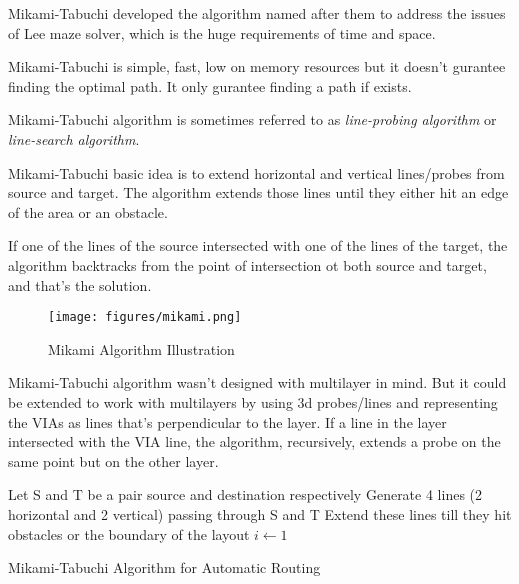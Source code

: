 Mikami-Tabuchi developed the algorithm named after them \cite{mikami1968computer} to address the issues of Lee maze solver, which is the huge requirements of time and space.

Mikami-Tabuchi is simple, fast, low on memory resources but it doesn't gurantee finding the optimal path. It only gurantee finding a path if exists.

Mikami-Tabuchi algorithm is sometimes referred to as \textit{line-probing algorithm} or \textit{line-search algorithm}.

Mikami-Tabuchi basic idea is to extend horizontal and vertical lines/probes from source and target. The algorithm extends those lines until they either hit an edge of the area or an obstacle.

If one of the lines of the source intersected with one of the lines of the target, the algorithm backtracks from the point of intersection ot both source and target, and that's the solution.

\begin{figure}
    \centering
    \texttt{[image: figures/mikami.png]}
    \caption{Mikami Algorithm Illustration \cite{chen2009global}}
    \label{fig:mikamiIllustr}
\end{figure}

Mikami-Tabuchi algorithm wasn't designed with multilayer in mind. But it could be extended to work with multilayers by using 3d probes/lines and representing the VIAs as lines that's perpendicular to the layer. If a line in the layer intersected with the VIA line, the algorithm, recursively, extends a probe on the same point but on the other layer.

\begin{algorithm}[]
\SetAlgoLined
{}
    Let S and T be a pair source and destination respectively\;
    Generate 4 lines (2 horizontal and 2 vertical) passing through S and T\;
    Extend these lines till they hit obstacles or the boundary of the layout\;
    $i \leftarrow 1$\;
    \caption{Mikami-Tabuchi Algorithm for Automatic Routing \cite{mikamiPresent}}
\end{algorithm}